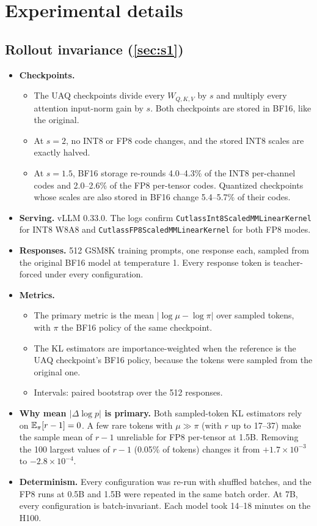 \section{Experimental details}\label{app:details}

\subsection{Rollout invariance (\texorpdfstring{\cref{sec:s1}}{Section 6.1})}
\begin{itemize}[leftmargin=*,itemsep=2pt]
\item \textbf{Checkpoints.}
  \begin{itemize}[leftmargin=*,itemsep=1pt]
  \item The UAQ checkpoints divide every $W_{Q,K,V}$ by $s$ and multiply every attention input-norm gain by $s$. Both checkpoints are stored in BF16, like the original.
  \item At $s=2$, no INT8 or FP8 code changes, and the stored INT8 scales are exactly halved.
  \item At $s=1.5$, BF16 storage re-rounds 4.0--4.3\% of the INT8 per-channel codes and 2.0--2.6\% of the FP8 per-tensor codes. Quantized checkpoints whose scales are also stored in BF16 change 5.4--5.7\% of their codes.
  \end{itemize}
\item \textbf{Serving.} vLLM 0.33.0. The logs confirm \texttt{CutlassInt8ScaledMMLinearKernel} for INT8 W8A8 and \texttt{CutlassFP8ScaledMMLinearKernel} for both FP8 modes.
\item \textbf{Responses.} 512 GSM8K training prompts, one response each, sampled from the original BF16 model at temperature 1. Every response token is teacher-forced under every configuration.
\item \textbf{Metrics.}
  \begin{itemize}[leftmargin=*,itemsep=1pt]
  \item The primary metric is the mean $|\log\mu-\log\pi|$ over sampled tokens, with $\pi$ the BF16 policy of the same checkpoint.
  \item The KL estimators are importance-weighted when the reference is the UAQ checkpoint's BF16 policy, because the tokens were sampled from the original one.
  \item Intervals: paired bootstrap over the 512 responses.
  \end{itemize}
\item \textbf{Why mean $|\Delta\log p|$ is primary.} Both sampled-token KL estimators rely on $\mathbb{E}_\pi[r-1]=0$. A few rare tokens with $\mu\gg\pi$ (with $r$ up to 17--37) make the sample mean of $r-1$ unreliable for FP8 per-tensor at 1.5B. Removing the 100 largest values of $r-1$ (0.05\% of tokens) changes it from $+1.7\times10^{-3}$ to $-2.8\times10^{-4}$.
\item \textbf{Determinism.} Every configuration was re-run with shuffled batches, and the FP8 runs at 0.5B and 1.5B were repeated in the same batch order. At 7B, every configuration is batch-invariant. Each model took 14--18 minutes on the H100.
\end{itemize}

